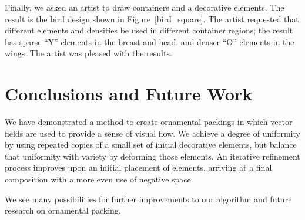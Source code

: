 Finally, we asked an artist to draw containers and a decorative elements.
The result is the bird design shown in Figure~\ref{bird_square}.
The artist requested that different elements and densities be used in 
different container regions; the result has sparse ``Y'' elements in 
the breast and head, and denser ``O'' elements in the wings. The artist was pleased with the results.





\section{Conclusions and Future Work}
\label{flowpak_conclusions_and_future_work}

We have demonstrated a method to create ornamental packings
in which vector fields are used to provide a sense of visual flow.
We achieve a degree of uniformity by using repeated copies of a small
set of initial decorative elements, but balance that uniformity with
variety by deforming those elements.  An iterative refinement process
improves upon an initial placement of elements, arriving at a final
composition with a more even use of negative space.

We see many possibilities for further improvements to our algorithm and
future research on ornamental packing.  


